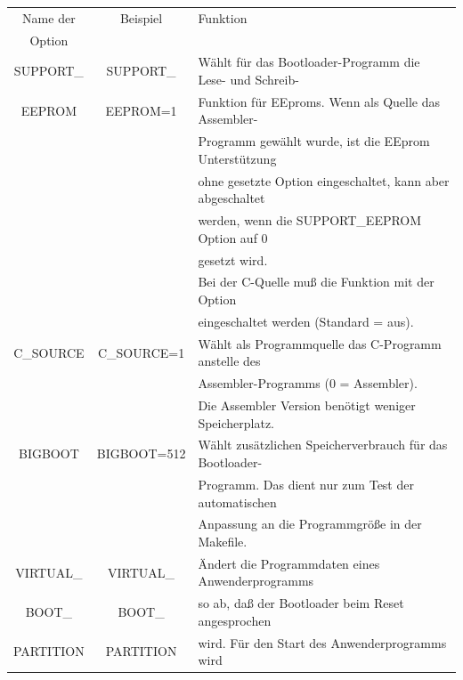\begin{table}[H]
  \begin{center}
    \begin{tabular}{| c | c | l |}
    \hline
   Name der        & Beispiel       & Funktion                                            \\
    Option         &                &                                                     \\
    \hline
    \hline
    SUPPORT\_      & SUPPORT\_      & Wählt für das Bootloader-Programm die Lese- und Schreib- \\
    EEPROM         &  EEPROM=1      & Funktion für EEproms. Wenn als Quelle das Assembler- \\
                   &                & Programm gewählt wurde, ist die EEprom Unterstützung \\
                   &                & ohne gesetzte Option eingeschaltet, kann aber abgeschaltet\\
                   &                & werden, wenn die SUPPORT\_EEPROM Option auf 0 \\
                   &                & gesetzt wird. \\
                   &                & Bei der C-Quelle muß die Funktion mit der Option \\
                   &                & eingeschaltet werden (Standard = aus). \\
    \hline
 C\_SOURCE         & C\_SOURCE=1    & Wählt als Programmquelle das C-Programm anstelle des  \\
                   &                & Assembler-Programms (0 = Assembler).\\
                   &                & Die Assembler Version benötigt weniger Speicherplatz. \\
    \hline
 BIGBOOT           & BIGBOOT=512    & Wählt zusätzlichen Speicherverbrauch für das Bootloader- \\
                   &                & Programm. Das dient nur zum Test der automatischen \\
                   &                & Anpassung an die Programmgröße in der Makefile. \\
    \hline
VIRTUAL\_          & VIRTUAL\_       &  Ändert die Programmdaten eines Anwenderprogramms \\
 BOOT\_            & BOOT\_          & so ab, daß der Bootloader beim Reset angesprochen \\
 PARTITION         & PARTITION       & wird. Für den Start des Anwenderprogramms wird \\

\end{tabular}
\end{center}
\end{table}
